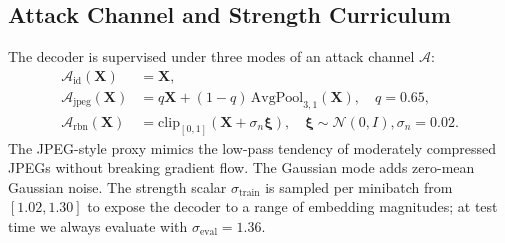 \documentclass[conference]{IEEEtran}
\begin{document}
\subsection{Attack Channel and Strength Curriculum}
\label{sec:attack}
The decoder is supervised under three modes of an attack channel $\mathcal{A}$:
\begin{align*}
    \mathcal{A}_{\text{id}}(\mathbf{X}) &= \mathbf{X}, \\
    \mathcal{A}_{\text{jpeg}}(\mathbf{X}) &= q\mathbf{X}+(1-q)\,\mathrm{AvgPool}_{3,1}(\mathbf{X}),\quad q=0.65, \\
    \mathcal{A}_{\text{rbn}}(\mathbf{X}) &= \mathrm{clip}_{[0,1]}(\mathbf{X}+\sigma_{n}\boldsymbol{\xi}),\quad \boldsymbol{\xi}\!\sim\!\mathcal{N}(0,I), \sigma_{n}=0.02.
\end{align*}
The JPEG-style proxy mimics the low-pass tendency of moderately compressed JPEGs without breaking gradient flow. The Gaussian mode adds zero-mean Gaussian noise. The strength scalar $\sigma_{\text{train}}$ is sampled per minibatch from $[1.02,1.30]$ to expose the decoder to a range of embedding magnitudes; at test time we always evaluate with $\sigma_{\text{eval}}=1.36$.
\end{document}
